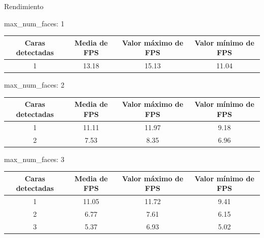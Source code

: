 \documentclass{beamer}
\begin{document}
\begin{frame}{Rendimiento}
\begin{block}{max\_num\_faces: 1}
\begin{table}[H]
\begin{center}
\begin{adjustbox}{max width=\textwidth}
\begin{tabular}{|c|c|c|c|}
     \hline
    \textbf{Caras detectadas} & \textbf{Media de FPS} & \textbf{Valor máximo de FPS} & \textbf{Valor mínimo de FPS}\\
    \hline
     1 & 13.18 & 15.13 & 11.04\\
     \hline
 \end{tabular}
 \end{adjustbox}
\end{center}
\end{table}
\end{block}

\begin{block}{max\_num\_faces: 2}
\begin{table}[H]
\begin{center}
\begin{adjustbox}{max width=\textwidth}
\begin{tabular}{|c|c|c|c|}
     \hline
    \textbf{Caras detectadas} & \textbf{Media de FPS} & \textbf{Valor máximo de FPS} & \textbf{Valor mínimo de FPS}\\
    \hline
     1 & 11.11 & 11.97 & 9.18\\
     2 & 7.53 & 8.35 & 6.96\\
     \hline
 \end{tabular}
 \end{adjustbox}
\end{center}
\end{table}
\end{block}

\begin{block}{max\_num\_faces: 3}
\begin{table}[H]
\begin{center}
\begin{adjustbox}{max width=\textwidth}
\begin{tabular}{|c|c|c|c|}
     \hline
    \textbf{Caras detectadas} & \textbf{Media de FPS} & \textbf{Valor máximo de FPS} & \textbf{Valor mínimo de FPS}\\
    \hline
     1 & 11.05 & 11.72 & 9.41\\
     2 & 6.77 & 7.61 & 6.15\\
     3 & 5.37 & 6.93 & 5.02\\
     \hline
 \end{tabular}
 \end{adjustbox}
\end{center}
\end{table}
\end{block}
\end{frame}
\end{document}
